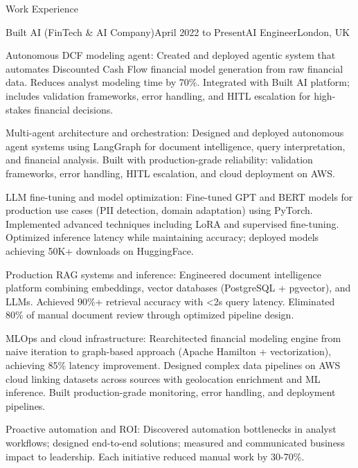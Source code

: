 \documentclass{resume} %
\begin{document}
\begin{rSection}{Work Experience}
\begin{rSubsection}{Built AI (FinTech \& AI Company)}{April 2022 to Present}{AI Engineer}{London, UK}
\item Autonomous DCF modeling agent: Created and deployed agentic system that automates Discounted Cash Flow financial model generation from raw financial data. Reduces analyst modeling time by 70\%. Integrated with Built AI platform; includes validation frameworks, error handling, and HITL escalation for high-stakes financial decisions.
\item Multi-agent architecture and orchestration: Designed and deployed autonomous agent systems using LangGraph for document intelligence, query interpretation, and financial analysis. Built with production-grade reliability: validation frameworks, error handling, HITL escalation, and cloud deployment on AWS.
\item LLM fine-tuning and model optimization: Fine-tuned GPT and BERT models for production use cases (PII detection, domain adaptation) using PyTorch. Implemented advanced techniques including LoRA and supervised fine-tuning. Optimized inference latency while maintaining accuracy; deployed models achieving 50K+ downloads on HuggingFace.
\item Production RAG systems and inference: Engineered document intelligence platform combining embeddings, vector databases (PostgreSQL + pgvector), and LLMs. Achieved 90\%+ retrieval accuracy with <2s query latency. Eliminated 80\% of manual document review through optimized pipeline design.
\item MLOps and cloud infrastructure: Rearchitected financial modeling engine from naive iteration to graph-based approach (Apache Hamilton + vectorization), achieving 85\% latency improvement. Designed complex data pipelines on AWS cloud linking datasets across sources with geolocation enrichment and ML inference. Built production-grade monitoring, error handling, and deployment pipelines.
\item Proactive automation and ROI: Discovered automation bottlenecks in analyst workflows; designed end-to-end solutions; measured and communicated business impact to leadership. Each initiative reduced manual work by 30-70\%.
\end{rSubsection}



\end{rSection}
\end{document}
